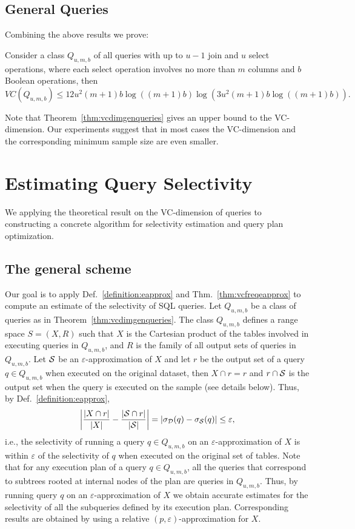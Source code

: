 \subsection{General Queries}\label{sec:vcdimgenqueries}
Combining the above results we prove:
\begin{theorem}\label{thm:vcdimgenqueries}
Consider a class $Q_{u,m,b}$ of all queries with up to $u-1$ join and $u$ select
operations, where each select operation involves no more than $m$ columns and $b$
Boolean operations, then 
\[
VC(Q_{u,m,b}) \leq
12u^2(m+1)b\log((m+1)b)\log(3u^2(m+1)b\log((m+1)b)).\]
\end{theorem}

Note that Theorem~\ref{thm:vcdimgenqueries} gives an upper bound to the
VC-dimension. Our experiments suggest that in most cases the VC-dimension and
the corresponding minimum sample size are even smaller.

\section{Estimating Query Selectivity}\label{sec:applications}
We applying the theoretical result on the VC-dimension of queries 
to constructing a concrete
algorithm for selectivity estimation and query plan optimization.

\subsection{The general scheme}
Our goal is to apply Def.~\ref{definition:eapprox} and Thm.~\ref{thm:vcfreqeapprox} to
compute an estimate of the selectivity of SQL queries. Let $Q_{u,m,b}$ be a
class of queries as in Theorem~\ref{thm:vcdimgenqueries}.
The class $Q_{u,m,b}$ defines a range space $S=(X,R)$ such that $X$ is the
Cartesian product of the tables involved in executing queries in $Q_{u,m,b}$,
and $R$ is the family of all output sets of queries in $Q_{u,m,b}$. 
Let ${\cal S}$ be an $\varepsilon$-approximation of $X$ and
let $r$ be the output set
of a query $q\in Q_{u,m,b}$ when executed on the original dataset, then $X\cap
r=r$ and $r\cap {\cal S}$ is the output set when the query is executed on the sample
(see details below). Thus, by Def.~\ref{definition:eapprox},
\[
\left|\frac{|X\cap r|}{|X|} - \frac{|{\cal S}\cap r|}{|{\cal S}|}\right|=
|\sigma_{\cal D}(q)-\sigma_{\cal S}(q)| \le\varepsilon,
\]
i.e., the selectivity of running a query $q\in Q_{u,m,b}$ on an $\varepsilon$-approximation of $X$ 
is
within $\varepsilon$ of the selectivity of $q$ when executed on the original set of tables.
Note that for any execution plan of a query $q\in Q_{u,m,b}$, all the queries
that correspond to subtrees rooted at internal nodes of the plan are queries in
$Q_{u,m,b}$. Thus, by running query $q$ on an $\varepsilon$-approximation of $X$ we obtain accurate
estimates for the selectivity of all the subqueries defined by its execution
plan. Corresponding results are obtained by using a relative
  $(p,\varepsilon)$-approximation for $X$.
  
